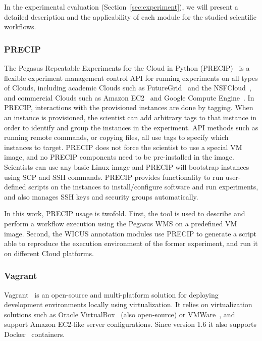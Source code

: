 In the experimental evaluation (Section~\ref{sec:experiment}), we will present a detailed description 
and the applicability of each module for the studied scientific workflows.



\subsubsection{PRECIP}
The Pegasus Repeatable Experiments for the Cloud in Python (PRECIP)~\cite{Azarnoosh-CRC-2013} 
is a flexible experiment management control API for running experiments on all types of Clouds, 
including academic Clouds such as FutureGrid~\cite{futuregrid} and the NSFCloud~\cite{chameleon,cloudlab}, 
and commercial Clouds such as Amazon EC2~\cite{aws} and Google Compute Engine~\cite{gce}. 
In PRECIP, interactions with the provisioned instances are done by tagging. When an instance is 
provisioned, the scientist can add arbitrary tags to that instance in order to identify and group the 
instances in the experiment. API methods such as running remote commands, or copying files, all 
use tags to specify which instances to target. PRECIP does not force the scientist to use a special 
VM image, and no PRECIP components need to be pre-installed in the image. Scientists can use 
any basic Linux image and PRECIP will bootstrap instances using SCP and SSH commands. 
PRECIP provides functionality to run user-defined scripts on the instances to install/configure 
software and run experiments, and also manages SSH keys and security groups automatically.

In this work, PRECIP usage is twofold. First, the tool is used to describe and perform a workflow 
execution using the Pegasus WMS on a predefined VM image. Second, the WICUS annotation 
modules use PRECIP to generate a script able to reproduce the execution environment of the 
former experiment, and run it on different Cloud platforms.


\subsubsection{Vagrant}

Vagrant~\cite{palat2012introducing} is an open-source and multi-platform solution for deploying 
development environments locally using virtualization. It relies on virtualization solutions such as 
Oracle VirtualBox~\cite{Watson2008} (also open-source) or  VMWare~\cite{vmware}, and support 
Amazon EC2-like server configurations. Since version 1.6 it also supports Docker~\cite{Merkel2014} containers.

